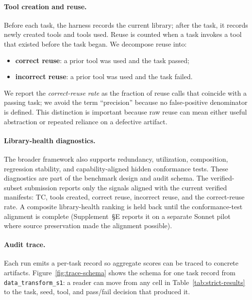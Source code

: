 \documentclass[sigconf,anonymous,review,natbib=false]{acmart}
\begin{document}
\paragraph{Tool creation and reuse.}
Before each task, the harness records the current library; after the task, it records newly created tools and tools used. Reuse is counted when a task invokes a tool that existed before the task began. We decompose reuse into:
\begin{itemize}[leftmargin=1.2em,noitemsep]
  \item \textbf{correct reuse}: a prior tool was used and the task passed;
  \item \textbf{incorrect reuse}: a prior tool was used and the task failed.
\end{itemize}
We report the \emph{correct-reuse rate} as the fraction of reuse calls that coincide with a passing task; we avoid the term ``precision'' because no false-positive denominator is defined. This distinction is important because raw reuse can mean either useful abstraction or repeated reliance on a defective artifact.

\paragraph{Library-health diagnostics.}
The broader framework also supports redundancy, utilization, composition, regression stability, and capability-aligned hidden conformance tests. These diagnostics are part of the benchmark design and audit schema. The verified-subset submission reports only the signals aligned with the current verified manifests: TC, tools created, correct reuse, incorrect reuse, and the correct-reuse rate. A composite library-health ranking is held back until the conformance-test alignment is complete (Supplement~\S E reports it on a separate Sonnet pilot where source preservation made the alignment possible).

\paragraph{Audit trace.}
Each run emits a per-task record so aggregate scores can be traced to concrete artifacts. Figure~\ref{fig:trace-schema} shows the schema for one task record from \texttt{data\_transform\_s1}: a reader can move from any cell in Table~\ref{tab:strict-results} to the task, seed, tool, and pass/fail decision that produced it.
\end{document}
